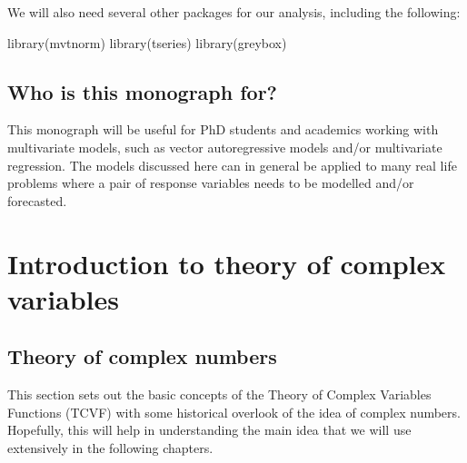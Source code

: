 \documentclass[
]{book}
\newenvironment{Shaded}{\begin{snugshade}}{\end{snugshade}}
\newcommand{\FunctionTok}[1]{\textcolor[rgb]{0.00,0.00,0.00}{#1}}
\newcommand{\NormalTok}[1]{#1}
\begin{document}
We will also need several other packages for our analysis, including the following:

\begin{Shaded}
\begin{Highlighting}[]
\FunctionTok{library}\NormalTok{(mvtnorm)}
\FunctionTok{library}\NormalTok{(tseries)}
\FunctionTok{library}\NormalTok{(greybox)}
\end{Highlighting}
\end{Shaded}

\hypertarget{who-is-this-monograph-for}{%
\section*{Who is this monograph for?}\label{who-is-this-monograph-for}}

This monograph will be useful for PhD students and academics working with multivariate models, such as vector autoregressive models and/or multivariate regression. The models discussed here can in general be applied to many real life problems where a pair of response variables needs to be modelled and/or forecasted.

\hypertarget{intro}{%
\chapter{Introduction to theory of complex variables}\label{intro}}

\hypertarget{theoryOfComplexNumbers}{%
\section{Theory of complex numbers}\label{theoryOfComplexNumbers}}

This section sets out the basic concepts of the Theory of Complex Variables Functions (TCVF) with some historical overlook of the idea of complex numbers. Hopefully, this will help in understanding the main idea that we will use extensively in the following chapters.
\end{document}
